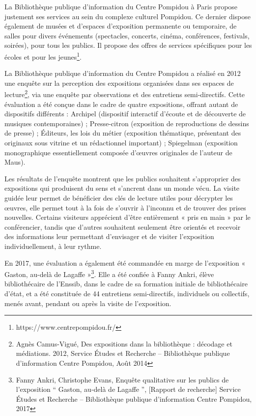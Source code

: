 \documentclass[french,a4paper,12pt]{article}
\begin{document}
La Bibliothèque publique d’information du Centre Pompidou à Paris propose justement ses services au sein du complexe culturel Pompidou. Ce dernier dispose également de musées et d’espaces d’exposition permanente ou temporaire, de salles pour divers événements (spectacles, concerts, cinéma, conférences, festivals, soirées), pour tous les publics. Il propose des offres de services spécifiques pour les écoles et pour les jeunes\footnote{https://www.centrepompidou.fr/}. 

\quad La Bibliothèque publique d’information du Centre Pompidou a réalisé en 2012 une enquête sur la perception des expositions organisées dans ses espaces de lecture\footnote{Agnès Camus-Vigué, Des expositions dans la bibliothèque : décodage et médiations. 2012, Service Études et Recherche – Bibliothèque publique d'information Centre Pompidou, Août 2014}, via une enquête par observations et des entretiens semi-directifs. Cette évaluation a été conçue dans le cadre de quatre expositions, offrant autant de dispositifs différents : Archipel (dispositif interactif d’écoute et de découverte de musiques contemporaines) ; Presse-citron (exposition de reproductions de dessins de presse) ; Éditeurs, les lois du métier (exposition thématique, présentant des originaux sous vitrine et un rédactionnel important) ; Spiegelman (exposition monographique essentiellement composée d’œuvres originales de l’auteur de Maus). 

Les résultats de l’enquête montrent que les publics souhaitent s’approprier des expositions qui produisent du sens et s’ancrent dans un monde vécu. La visite guidée leur permet de bénéficier des clés de lecture utiles pour décrypter les œuvres, elle permet tout à la fois de s’ouvrir à l’inconnu et de trouver des prises nouvelles. Certains visiteurs apprécient d’être entièrement « pris en main » par le conférencier, tandis que d’autres souhaitent seulement être orientés et recevoir des informations leur permettant d'envisager et de visiter l’exposition individuellement, à leur rythme. 

\quad En 2017, une évaluation a également été commandée en marge de l’exposition « Gaston, au-delà de Lagaffe »\footnote{Fanny Ankri, Christophe Evans, Enquête qualitative sur les publics de l’exposition “ Gaston, au-delà de Lagaffe ”, [Rapport de recherche] Service Études et Recherche – Bibliothèque publique d'information Centre Pompidou, 2017}. Elle a été confiée à Fanny Ankri, élève bibliothécaire de l’Enssib, dans le cadre de sa formation initiale de bibliothécaire d’état, et a été constituée de 44 entretiens semi-directifs, individuels ou collectifs, menés avant, pendant ou après la visite de l’exposition.  
\end{document}
